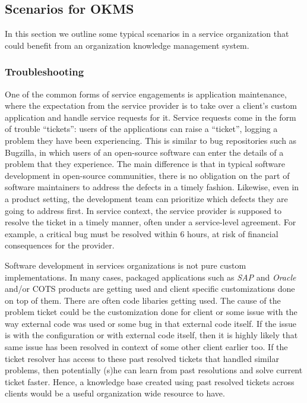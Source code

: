 \subsection{Scenarios for OKMS}

In this section we outline some typical scenarios in a service organization that could benefit from an organization knowledge management system. 

\subsubsection{Troubleshooting}

One of the common forms of service engagements is application maintenance, where the expectation from the service provider is to take over a client's custom application and handle service requests for it.  Service requests come in the form of trouble ``tickets'': users of the applications can raise a ``ticket'', logging a problem they have been experiencing. This is similar to bug repositories such as Bugzilla, in which users of an open-source software can enter the details of a problem that they experience.  The main difference is that in typical software development in open-source communities, there is no obligation on the part of software maintainers to address the defects in a timely fashion. Likewise, even in a product setting, the development team can prioritize which defects they are going to address first.  In service context, the service provider is supposed to resolve the ticket in a timely manner, often under a service-level agreement. For example, a critical bug must be resolved within 6 hours, at risk of financial consequences for the provider. 

Software development in services organizations is not pure custom implementations. In many cases, packaged applications such as \textit{SAP} and \textit{Oracle} and/or COTS products are getting used and client specific customizations done on top of them. There are often code libaries getting used.
The cause of the problem ticket could be the customization done for client or some issue with the way external code was used or some bug in that external code itself. If the issue is with the configuration or with external code itself, then it is highly likely that same issue has been resolved in context of some other client earlier too. If the ticket resolver has access to these past resolved tickets that handled similar problems, then potentially (s)he can learn from past resolutions and solve current ticket faster. Hence, a knowledge base created using past resolved tickets across clients would be a useful organization wide resource to have. 

